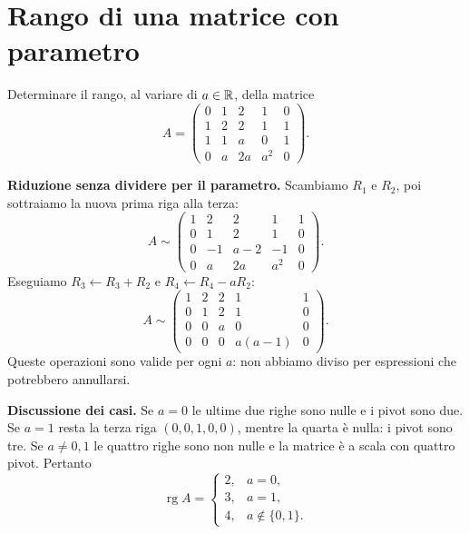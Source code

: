 \section{Rango di una matrice con parametro}
\begin{esercizio}
Determinare il rango, al variare di $a\in\mathbb{R}$, della matrice
\[
 A=\begin{pmatrix}
 0&1&2&1&0\\1&2&2&1&1\\1&1&a&0&1\\0&a&2a&a^2&0
 \end{pmatrix}.
\]
\end{esercizio}
\begin{svolgimento}
\textbf{Riduzione senza dividere per il parametro.} Scambiamo $R_1$ e $R_2$, poi sottraiamo la nuova prima riga alla terza:
\[
 A\sim\begin{pmatrix}
 1&2&2&1&1\\0&1&2&1&0\\0&-1&a-2&-1&0\\0&a&2a&a^2&0
 \end{pmatrix}.
\]
Eseguiamo $R_3\leftarrow R_3+R_2$ e $R_4\leftarrow R_4-aR_2$:
\[
 A\sim\begin{pmatrix}
 1&2&2&1&1\\0&1&2&1&0\\0&0&a&0&0\\0&0&0&a(a-1)&0
 \end{pmatrix}.
\]
Queste operazioni sono valide per ogni $a$: non abbiamo diviso per espressioni che potrebbero annullarsi.

\textbf{Discussione dei casi.} Se $a=0$ le ultime due righe sono nulle e i pivot sono due. Se $a=1$ resta la terza riga $(0,0,1,0,0)$, mentre la quarta è nulla: i pivot sono tre. Se $a\ne0,1$ le quattro righe sono non nulle e la matrice è a scala con quattro pivot. Pertanto
\[
 \operatorname{rg}A=\begin{cases}
 2,&a=0,\\3,&a=1,\\4,&a\notin\{0,1\}.
 \end{cases}
\]
\end{svolgimento}
